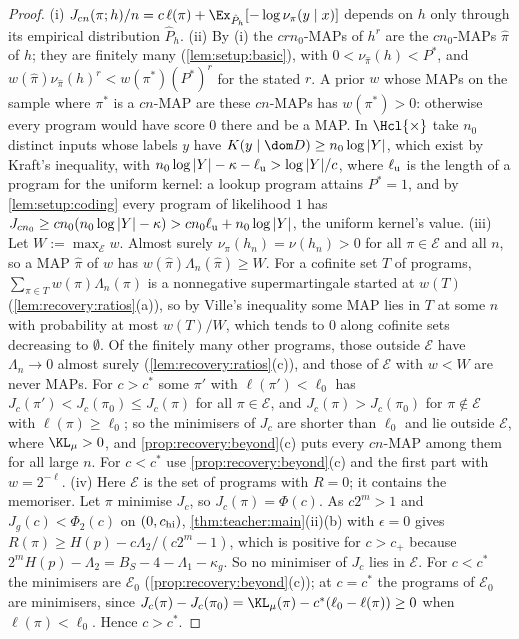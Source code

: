 \begin{proof}
(i) $J_{cn}(\pi;h)/n=c\,\ell(\pi)+\Ex_{\hat P_h}[-\log\nu_\pi(y\mid x)]$ depends on $h$ only through its empirical distribution $\hat P_h$. (ii) By (i) the $crn_0$-MAPs of $h^r$ are the $cn_0$-MAPs $\hat\pi$ of $h$; they are finitely many (\cref{lem:setup:basic}), with $0<\nu_{\hat\pi}(h)<P^*$, and $w(\hat\pi)\nu_{\hat\pi}(h)^r<w(\pi^*)(P^*)^r$ for the stated $r$. A prior $w$ whose MAPs on the sample where $\pi^*$ is a $cn$-MAP are these $cn$-MAPs has $w(\pi^*)>0$: otherwise every program would have score $0$ there and be a MAP. In $\Hcl{\times}$ take $n_0$ distinct inputs whose labels $y$ have $K(y\mid\dom D)\ge n_0\log|Y|$, which exist by Kraft's inequality, with $n_0\log|Y|-\kappa-\ell_{\rm u}>\log|Y|/c$, where $\ell_{\rm u}$ is the length of a program for the uniform kernel: a lookup program attains $P^*=1$, and by \cref{lem:setup:coding} every program of likelihood $1$ has $J_{cn_0}\ge cn_0(n_0\log|Y|-\kappa)>cn_0\ell_{\rm u}+n_0\log|Y|$, the uniform kernel's value. (iii) Let $W:=\max_{\mathcal E}w$. Almost surely $\nu_\pi(h_n)=\nu(h_n)>0$ for all $\pi\in\mathcal E$ and all $n$, so a MAP $\hat\pi$ of $w$ has $w(\hat\pi)\Lambda_n(\hat\pi)\ge W$. For a cofinite set $T$ of programs, $\sum_{\pi\in T}w(\pi)\Lambda_n(\pi)$ is a nonnegative supermartingale started at $w(T)$ (\cref{lem:recovery:ratios}(a)), so by Ville's inequality some MAP lies in $T$ at some $n$ with probability at most $w(T)/W$, which tends to $0$ along cofinite sets decreasing to $\emptyset$. Of the finitely many other programs, those outside $\mathcal E$ have $\Lambda_n\to0$ almost surely (\cref{lem:recovery:ratios}(c)), and those of $\mathcal E$ with $w<W$ are never MAPs. For $c>c^*$ some $\pi'$ with $\ell(\pi')<\ell_0$ has $J_c(\pi')<J_c(\pi_0)\le J_c(\pi)$ for all $\pi\in\mathcal E$, and $J_c(\pi)>J_c(\pi_0)$ for $\pi\notin\mathcal E$ with $\ell(\pi)\ge\ell_0$; so the minimisers of $J_c$ are shorter than $\ell_0$ and lie outside $\mathcal E$, where $\KL_\mu>0$, and \cref{prop:recovery:beyond}(c) puts every $cn$-MAP among them for all large $n$. For $c<c^*$ use \cref{prop:recovery:beyond}(c) and the first part with $w=2^{-\ell}$. (iv) Here $\mathcal E$ is the set of programs with $R=0$; it contains the memoriser. Let $\pi$ minimise $J_c$, so $J_c(\pi)=\Phi(c)$. As $c2^m>1$ and $J_g(c)<\Phi_2(c)$ on $(0,c_{\rm hi})$, \cref{thm:teacher:main}(ii)(b) with $\epsilon=0$ gives $R(\pi)\ge H(p)-c\Lambda_2/(c2^m-1)$, which is positive for $c>c_+$ because $2^mH(p)-\Lambda_2=B_S-4-\Lambda_1-\kappa_g$. So no minimiser of $J_c$ lies in $\mathcal E$. For $c<c^*$ the minimisers are $\mathcal E_0$ (\cref{prop:recovery:beyond}(c)); at $c=c^*$ the programs of $\mathcal E_0$ are minimisers, since $J_c(\pi)-J_c(\pi_0)=\KL_\mu(\pi)-c^*(\ell_0-\ell(\pi))\ge0$ when $\ell(\pi)<\ell_0$. Hence $c>c^*$.
\end{proof}

